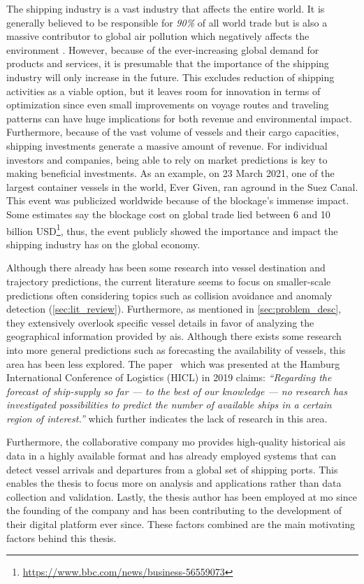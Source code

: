 The shipping industry is a vast industry that affects the entire world. It is generally believed to be responsible for \textit{90\%} of all world trade \parencite{grote2016} but is also a massive contributor to global air pollution which negatively affects the environment \parencite{zheng2016:online}. However, because of the ever-increasing global demand for products and services, it is presumable that the importance of the shipping industry will only increase in the future. This excludes reduction of shipping activities as a viable option, but it leaves room for innovation in terms of optimization since even small improvements on voyage routes and traveling patterns can have huge implications for both revenue and environmental impact. Furthermore, because of the vast volume of vessels and their cargo capacities, shipping investments generate a massive amount of revenue. For individual investors and companies, being able to rely on market predictions is key to making beneficial investments. As an example, on 23 March 2021, one of the largest container vessels in the world, Ever Given, ran aground in the Suez Canal. This event was publicized worldwide because of the blockage's immense impact. Some estimates say the blockage cost on global trade lied between 6 and 10 billion USD\footnote{\url{https://www.bbc.com/news/business-56559073}}, thus, the event publicly showed the importance and impact the shipping industry has on the global economy.

Although there already has been some research into vessel destination and trajectory predictions, the current literature seems to focus on smaller-scale predictions often considering topics such as collision avoidance and anomaly detection (\cref{sec:lit_review}). Furthermore, as mentioned in \cref{sec:problem_desc}, they extensively overlook specific vessel details in favor of analyzing the geographical information provided by \acrshort{ais}. Although there exists some research into more general predictions such as forecasting the availability of vessels, this area has been less explored. The paper~\cite{lechtenberg2019} which was presented at the Hamburg International Conference of Logistics (HICL) in 2019 claims: \textit{“Regarding the forecast of ship-supply so far --- to the best of our knowledge --- no research has investigated possibilities to predict the number of available ships in a certain region of interest.”} which further indicates the lack of research in this area.

Furthermore, the collaborative company \acrfull{mo} provides high-quality historical \acrshort{ais} data in a highly available format and has already employed systems that can detect vessel arrivals and departures from a global set of shipping ports. This enables the thesis to focus more on analysis and applications rather than data collection and validation. Lastly, the thesis author has been employed at \acrshort{mo} since the founding of the company and has been contributing to the development of their digital platform ever since. These factors combined are the main motivating factors behind this thesis.

